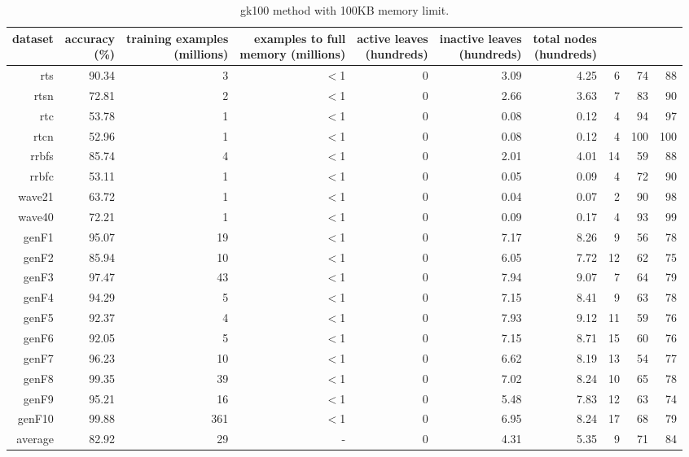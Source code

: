 \clearpage
\begin{table}
\caption{{\sc gk100} method with 100KB memory limit.}
\label{tab:gk100-100k}
\centering
\begin{tabular}{|r|r|r|r|r|r|r|r|r|r|}
\hline
dataset	&
\rotatebox{90}{\parbox{9em}{accuracy\\(\%)}} &
\rotatebox{90}{\parbox{9em}{training examples\\(millions)}} &
\rotatebox{90}{\parbox{9em}{examples to full\\memory (millions)}} &
\rotatebox{90}{\parbox{9em}{active leaves\\(hundreds)}} &
\rotatebox{90}{\parbox{9em}{inactive leaves\\(hundreds)}} &
\rotatebox{90}{\parbox{9em}{total nodes\\(hundreds)}} &
\rotatebox{90}{\parbox{9em}{tree depth}}	&
\rotatebox{90}{\parbox{9em}{training speed (\%)}} &
\rotatebox{90}{\parbox{9em}{prediction speed (\%)}} \\
\hline
{\sc rts} & 90.34 & 3 & $<$1 & 0 & 3.09 & 4.25 & 6 & 74 & 88 \\
{\sc rtsn} & 72.81 & 2 & $<$1 & 0 & 2.66 & 3.63 & 7 & 83 & 90 \\
{\sc rtc} & 53.78 & 1 & $<$1 & 0 & 0.08 & 0.12 & 4 & 94 & 97 \\
{\sc rtcn} & 52.96 & 1 & $<$1 & 0 & 0.08 & 0.12 & 4 & 100 & 100 \\
{\sc rrbfs} & 85.74 & 4 & $<$1 & 0 & 2.01 & 4.01 & 14 & 59 & 88 \\
{\sc rrbfc} & 53.11 & 1 & $<$1 & 0 & 0.05 & 0.09 & 4 & 72 & 90 \\
{\sc wave21} & 63.72 & 1 & $<$1 & 0 & 0.04 & 0.07 & 2 & 90 & 98 \\
{\sc wave40} & 72.21 & 1 & $<$1 & 0 & 0.09 & 0.17 & 4 & 93 & 99 \\
{\sc genF1} & 95.07 & 19 & $<$1 & 0 & 7.17 & 8.26 & 9 & 56 & 78 \\
{\sc genF2} & 85.94 & 10 & $<$1 & 0 & 6.05 & 7.72 & 12 & 62 & 75 \\
{\sc genF3} & 97.47 & 43 & $<$1 & 0 & 7.94 & 9.07 & 7 & 64 & 79 \\
{\sc genF4} & 94.29 & 5 & $<$1 & 0 & 7.15 & 8.41 & 9 & 63 & 78 \\
{\sc genF5} & 92.37 & 4 & $<$1 & 0 & 7.93 & 9.12 & 11 & 59 & 76 \\
{\sc genF6} & 92.05 & 5 & $<$1 & 0 & 7.15 & 8.71 & 15 & 60 & 76 \\
{\sc genF7} & 96.23 & 10 & $<$1 & 0 & 6.62 & 8.19 & 13 & 54 & 77 \\
{\sc genF8} & 99.35 & 39 & $<$1 & 0 & 7.02 & 8.24 & 10 & 65 & 78 \\
{\sc genF9} & 95.21 & 16 & $<$1 & 0 & 5.48 & 7.83 & 12 & 63 & 74 \\
{\sc genF10} & 99.88 & 361 & $<$1 & 0 & 6.95 & 8.24 & 17 & 68 & 79 \\
\hline
average & 82.92 & 29 &  -  & 0 & 4.31 & 5.35 & 9 & 71 & 84 \\
\hline
\end{tabular}
\end{table}
